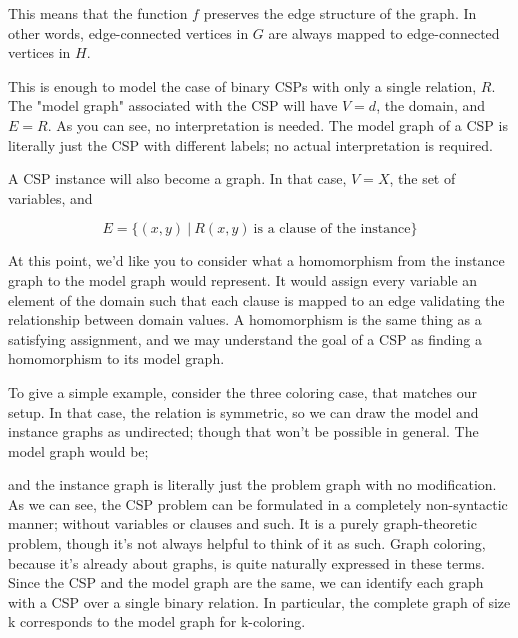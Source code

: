 This means that the function $f$ preserves the edge structure of the graph. In other words, edge-connected vertices in $G$ are always mapped to edge-connected vertices in $H$.

This is enough to model the case of binary CSPs with only a single relation, $R$. The "model graph" associated with the CSP will have $V = d$, the domain, and $E = R$. As you can see, no interpretation is needed. The model graph of a CSP is literally just the CSP with different labels; no actual interpretation is required.

A CSP instance will also become a graph. In that case, $V = X$, the set of variables, and

\begin{equation}
    E = \{ (x, y)\ |\ R(x, y)\ \text{is a clause of the instance} \}
\end{equation}

At this point, we'd like you to consider what a homomorphism from the instance graph to the model graph would represent. It would assign every variable an element of the domain such that each clause is mapped to an edge validating the relationship between domain values. A homomorphism is the same thing as a satisfying assignment, and we may understand the goal of a CSP as finding a homomorphism to its model graph.

To give a simple example, consider the three coloring case, that matches our setup. In that case, the relation is symmetric, so we can draw the model and instance graphs as undirected; though that won't be possible in general. The model graph would be;

\begin{center}
\end{center}


and the instance graph is literally just the problem graph with no modification. As we can see, the CSP problem can be formulated in a completely non-syntactic manner; without variables or clauses and such. It is a purely graph-theoretic problem, though it's not always helpful to think of it as such. Graph coloring, because it's already about graphs, is quite naturally expressed in these terms. Since the CSP and the model graph are the same, we can identify each graph with a CSP over a single binary relation. In particular, the complete graph of size k corresponds to the model graph for k-coloring.

